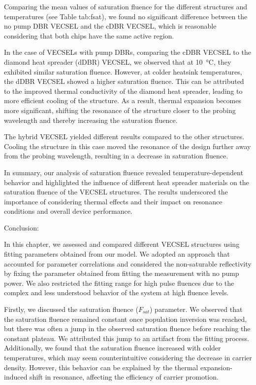 Comparing the mean values of saturation fluence for the different structures and temperatures (see Table tab:fsat), we found no significant difference between the no pump DBR VECSEL and the cDBR VECSEL, which is reasonable considering that both chips have the same active region.

In the case of VECSELs with pump DBRs, comparing the cDBR VECSEL to the diamond heat spreader (dDBR) VECSEL, we observed that at \qty{10}{\celsius}, they exhibited similar saturation fluence. However, at colder heatsink temperatures, the dDBR VECSEL showed a higher saturation fluence. This can be attributed to the improved thermal conductivity of the diamond heat spreader, leading to more efficient cooling of the structure. As a result, thermal expansion becomes more significant, shifting the resonance of the structure closer to the probing wavelength and thereby increasing the saturation fluence.

The hybrid VECSEL yielded different results compared to the other structures. Cooling the structure in this case moved the resonance of the design further away from the probing wavelength, resulting in a decrease in saturation fluence.

In summary, our analysis of saturation fluence revealed temperature-dependent behavior and highlighted the influence of different heat spreader materials on the saturation fluence of the VECSEL structures. The results underscored the importance of considering thermal effects and their impact on resonance conditions and overall device performance.

Conclusion:

In this chapter, we assessed and compared different VECSEL structures using fitting parameters obtained from our model. We adopted an approach that accounted for parameter correlations and considered the non-saturable reflectivity by fixing the parameter obtained from fitting the measurement with no pump power. We also restricted the fitting range for high pulse fluences due to the complex and less understood behavior of the system at high fluence levels.

Firstly, we discussed the saturation fluence ($F_{sat}$) parameter. We observed that the saturation fluence remained constant once population inversion was reached, but there was often a jump in the observed saturation fluence before reaching the constant plateau. We attributed this jump to an artifact from the fitting process. Additionally, we found that the saturation fluence increased with colder temperatures, which may seem counterintuitive considering the decrease in carrier density. However, this behavior can be explained by the thermal expansion-induced shift in resonance, affecting the efficiency of carrier promotion.


